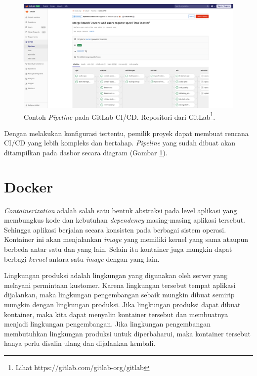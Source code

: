     
    \begin{figure}
        \begin{minipage}{\textwidth}
            \centering
            \includegraphics[width=0.7\paperwidth]{Gambar/gitlab-ci-pipeline.png}
            \caption{Contoh \textit{Pipeline} pada GitLab CI/CD. Repositori dari
            GitLab\footnote{Lihat https://gitlab.com/gitlab-org/gitlab}.}
            \label{fig:gitlab-ci:pipeline}
        \end{minipage}
    \end{figure}
    
    Dengan melakukan konfigurasi tertentu, pemilik proyek dapat membuat rencana
    CI/CD yang lebih kompleks dan bertahap. \textit{Pipeline} yang sudah dibuat
    akan ditampilkan pada dasbor secara diagram (Gambar
    \ref{fig:gitlab-ci:pipeline}).

\section{Docker}
    \textit{Containerization} adalah salah satu bentuk abstraksi pada level
    aplikasi yang membungkus kode dan kebutuhan \textit{dependency} masing-masing aplikasi tersebut.
    Sehingga aplikasi berjalan secara konsisten pada berbagai sistem
    operasi\cite{docker:what-is-container}. Kontainer ini akan menjalankan
    \textit{image} yang memiliki kernel yang sama ataupun berbeda antar satu dan
    yang lain. Selain itu kontainer juga mungkin dapat berbagi \textit{kernel} antara
    satu \textit{image} dengan yang lain.
    
    Lingkungan produksi adalah lingkungan yang digunakan oleh server yang
    melayani permintaan kustomer. Karena lingkungan tersebut tempat aplikasi
    dijalankan, maka lingkungan pengembangan sebaik mungkin dibuat semirip
    mungkin dengan lingkungan produksi. Jika lingkungan produksi dapat
    dibuat kontainer, maka kita dapat menyalin kontainer tersebut dan membuatnya
    menjadi lingkungan pengembangan. Jika lingkungan pengembangan membutuhkan
    lingkungan produksi untuk diperbaharui, maka kontainer tersebut hanya perlu
    disalin ulang dan dijalankan kembali.
    
